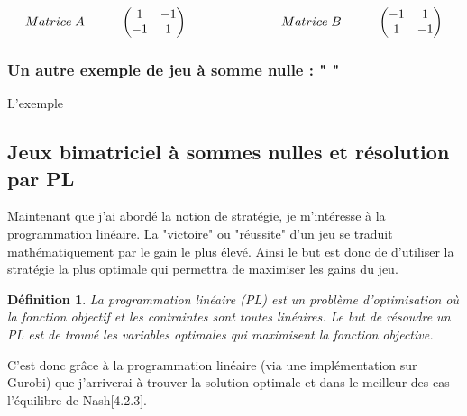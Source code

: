 \documentclass[a4paper, 12pt, twoside]{article}
\newtheorem{definition}{Définition}
\begin{document}
{{\[
Matrice\hspace{0,1cm} A\hspace{1cm}
\begin{pmatrix}1&-1\\
-1&1\\
\end{pmatrix}\                      \hspace{2,5cm}  
Matrice\hspace{0,1cm} B \hspace{1cm}  
\begin{pmatrix}-1&1\\
1&-1\\
\end{pmatrix} 
\]
\subsubsection{Un autre exemple de jeu à somme nulle : " "}
L'exemple
\subsection{Jeux bimatriciel à sommes nulles et résolution par PL}



Maintenant que j'ai abordé la notion de stratégie, je m'intéresse à la programmation linéaire. La "victoire" ou "réussite" d'un jeu se traduit mathématiquement par le \textsf{gain} le plus élevé. Ainsi le but est donc de d'utiliser la stratégie la plus optimale qui permettra de maximiser les \textsf{gains} du jeu.

\begin{definition}
La programmation linéaire (PL) est un problème d'optimisation où la fonction objectif et les contraintes sont toutes linéaires. Le but de résoudre un PL est de trouvé les variables optimales qui maximisent la fonction objective.
\end{definition}

C'est donc grâce à la \textsf{programmation linéaire} (via une implémentation sur \textsf{Gurobi}) que  j'arriverai à trouver la solution optimale et dans le meilleur des cas \textsf{l'équilibre de Nash}[4.2.3]. \newline

}}
\end{document}
